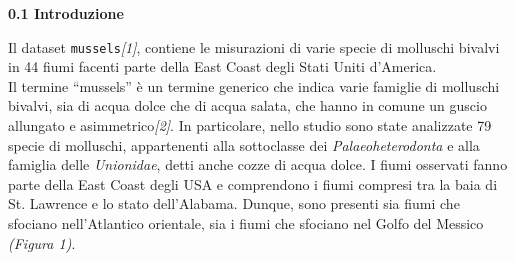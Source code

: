 \documentclass{article} %
\begin{document}
\newpage
\begin{flushleft}
\textbf{\Large 0.1 \: Introduzione}    
\end{flushleft}

Il dataset \texttt{mussels}\textit{[1]}, contiene le misurazioni di varie specie di molluschi bivalvi  in 44 fiumi facenti parte della East Coast degli Stati Uniti d'America.\\ 
Il termine “mussels” è un termine generico che indica varie famiglie di molluschi bivalvi, sia di acqua dolce che di acqua salata, che hanno in comune un guscio allungato e asimmetrico\textit{[2]}. In particolare, nello studio sono state analizzate 79 specie di molluschi, appartenenti alla sottoclasse dei \textit{Palaeoheterodonta} e alla famiglia delle \textit{Unionidae}, detti anche cozze di acqua dolce. 
I fiumi osservati fanno parte della East Coast degli USA e comprendono i fiumi compresi tra la baia di St. Lawrence e lo stato dell'Alabama. Dunque, sono presenti sia fiumi che sfociano nell'Atlantico orientale, sia i fiumi che sfociano nel Golfo del Messico \textit{(Figura 1)}. 
\end{document}
